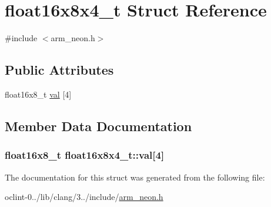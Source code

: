 \hypertarget{structfloat16x8x4__t}{\section{float16x8x4\-\_\-t Struct Reference}
\label{structfloat16x8x4__t}
}


{\ttfamily \#include $<$arm\-\_\-neon.\-h$>$}

\subsection*{Public Attributes}
\begin{DoxyCompactItemize}
\item 
float16x8\-\_\-t \hyperlink{structfloat16x8x4__t_a480fa7cd668155702a6df360325d554b}{val} \mbox{[}4\mbox{]}
\end{DoxyCompactItemize}


\subsection{Member Data Documentation}
\hypertarget{structfloat16x8x4__t_a480fa7cd668155702a6df360325d554b}{
\subsubsection[{val}]{\setlength{\rightskip}{0pt plus 5cm}float16x8\-\_\-t float16x8x4\-\_\-t\-::val\mbox{[}4\mbox{]}}}\label{structfloat16x8x4__t_a480fa7cd668155702a6df360325d554b}


The documentation for this struct was generated from the following file\-:\begin{DoxyCompactItemize}
\item 
oclint-\/0../lib/clang/3../include/\hyperlink{arm__neon_8h}{arm\-\_\-neon.\-h}\end{DoxyCompactItemize}
